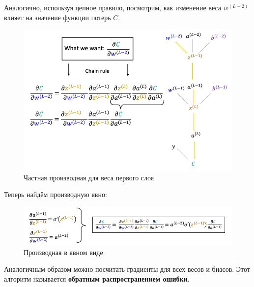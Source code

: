 \documentclass[a4paper, 10pt, openany]{book} %
\begin{document}
	Аналогично, используя цепное правило, посмотрим, как изменение веса $w^{(L-2)}$ влияет на значение функции потерь $C$.
	
	\begin{figure}[h!]
		\centering
		\includegraphics[width=\linewidth]{pictures/backpropagation/first_layer_weight.png}
		\caption{Частная производная для веса первого слоя}
		\label{first_layer_weight}
	\end{figure}
	
	Теперь найдём производную явно:
	
	\begin{figure}[h!]
		\centering
		\includegraphics[width=\linewidth]{pictures/backpropagation/first_layer_itself.png}
		\caption{Производная в явном виде}
		\label{first_layer_itself}
	\end{figure}
	
	Аналогичным образом можно посчитать градиенты для всех весов и биасов. Этот алгоритм называется \textbf{обратным распространением ошибки}.
	
	
	
	
	
	
	
	
	
	
	
	
	
	
	
	
	
	
	
	
	
	
\end{document}
